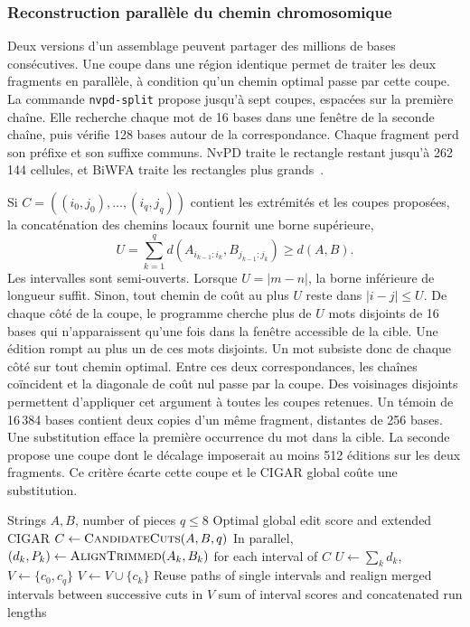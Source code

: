 \subsubsection{Reconstruction parallèle du chemin chromosomique}\label{sec:split}
Deux versions d'un assemblage peuvent partager des millions de bases consécutives. Une coupe dans une région identique permet de traiter les deux fragments en parallèle, à condition qu'un chemin optimal passe par cette coupe. La commande \texttt{nvpd-split} propose jusqu'à sept coupes, espacées sur la première chaîne. Elle recherche chaque mot de 16 bases dans une fenêtre de la seconde chaîne, puis vérifie 128 bases autour de la correspondance. Chaque fragment perd son préfixe et son suffixe communs. NvPD traite le rectangle restant jusqu'à 262\,144 cellules, et BiWFA traite les rectangles plus grands~\cite{sadiq,biwfa}.

Si \(C=((i_0,j_0),\ldots,(i_q,j_q))\) contient les extrémités et les coupes proposées, la concaténation des chemins locaux fournit une borne supérieure,
\[
 U=\sum_{k=1}^{q} d(A_{i_{k-1}:i_k},B_{j_{k-1}:j_k})\ge d(A,B).
\]
Les intervalles sont semi-ouverts. Lorsque \(U=|m-n|\), la borne inférieure de longueur suffit. Sinon, tout chemin de coût au plus \(U\) reste dans \(|i-j|\le U\). De chaque côté de la coupe, le programme cherche plus de \(U\) mots disjoints de 16 bases qui n'apparaissent qu'une fois dans la fenêtre accessible de la cible. Une édition rompt au plus un de ces mots disjoints. Un mot subsiste donc de chaque côté sur tout chemin optimal. Entre ces deux correspondances, les chaînes coïncident et la diagonale de coût nul passe par la coupe. Des voisinages disjoints permettent d'appliquer cet argument à toutes les coupes retenues. Un témoin de 16\,384 bases contient deux copies d'un même fragment, distantes de 256 bases. Une substitution efface la première occurrence du mot dans la cible. La seconde propose une coupe dont le décalage imposerait au moins 512 éditions sur les deux fragments. Ce critère écarte cette coupe et le CIGAR global coûte une substitution.

\begin{algorithm}[H]
\caption{Reconstruction par coupes vérifiées}\label{alg:split}
\begin{algorithmic}[1]
\Require Strings \(A,B\), number of pieces \(q\le8\)
\Ensure Optimal global edit score and extended CIGAR
\State \(C\gets\textsc{CandidateCuts}(A,B,q)\)
\State In parallel, \((d_k,P_k)\gets\textsc{AlignTrimmed}(A_k,B_k)\) for each interval of \(C\)
\State \(U\gets\sum_k d_k\), \(V\gets\{c_0,c_q\}\)
   \State \(V\gets V\cup\{c_k\}\) \EndIf
\EndFor
\State Reuse paths of single intervals and realign merged intervals between successive cuts in \(V\)
\State \Return sum of interval scores and concatenated run lengths
\end{algorithmic}
\end{algorithm}

